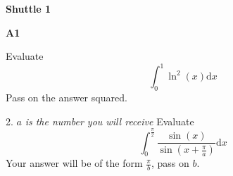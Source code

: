\documentclass[11pt, a4paper]{article}
\newcommand{\dd}{\mathrm{d}}
\begin{document}
\begin{enumerate}








\textbf{\LARGE Shuttle 1} \newline

\begin{flushright}
\textbf{\LARGE A1}
\end{flushright}

Evaluate $$\int_0^1 \ln^2(x) \dd x$$
Pass on the answer squared. \newline  \newline \newline \newline \newline \newline

2. $a$\textit{ is the number you will receive} \newline
Evaluate $$\int_0^{\frac{\pi}{2}} \frac{\sin(x)}{\sin(x+\frac{\pi}{a}
)} \dd x$$
Your answer will be of the form $\frac{\pi}{b}$, pass on $b$. \newline  \newline \newline \newline \newline \newline


\end{enumerate}
\end{document}
